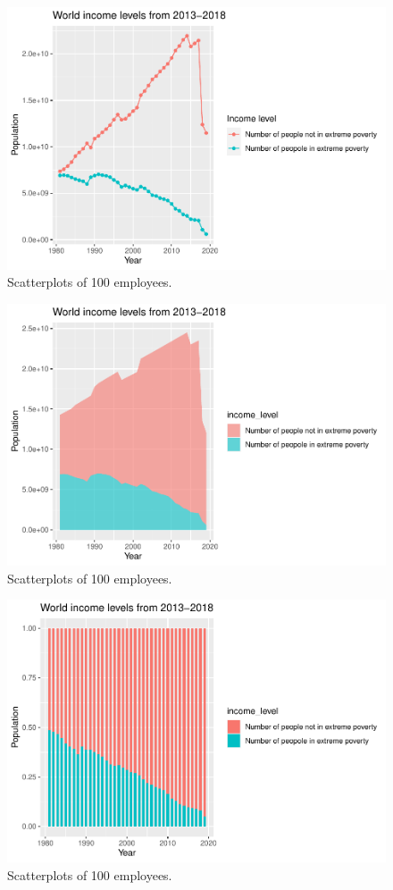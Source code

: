 \documentclass[
]{article}
\begin{document}
\begin{figure}[H]

{\centering \includegraphics[width=0.68\linewidth]{Poster_Formal_files/figure-latex/data process for question 1-1} 

}

\caption{\label{fig:Scatterplots} Scatterplots of 100 employees.}\label{fig:data process for question 1-1}
\end{figure}
\begin{figure}[H]

{\centering \includegraphics[width=0.68\linewidth]{Poster_Formal_files/figure-latex/data process for question 1-2} 

}

\caption{\label{fig:Scatterplots} Scatterplots of 100 employees.}\label{fig:data process for question 1-2}
\end{figure}
\begin{figure}[H]

{\centering \includegraphics[width=0.68\linewidth]{Poster_Formal_files/figure-latex/data process for question 1-3} 

}

\caption{\label{fig:Scatterplots} Scatterplots of 100 employees.}\label{fig:data process for question 1-3}
\end{figure}
\end{document}
